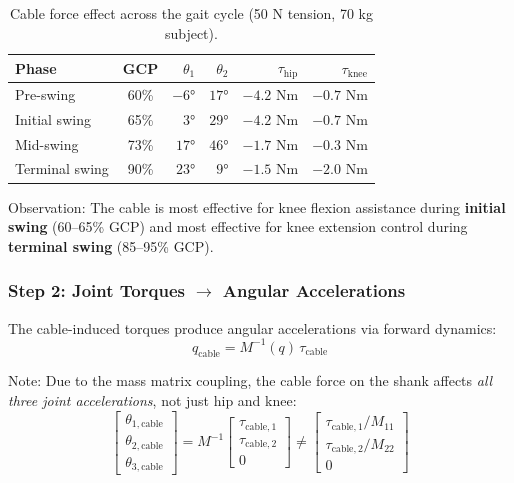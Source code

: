 \documentclass[11pt,a4paper]{article}
\newcommand{\vc}[1]{\bm{#1}}
\newcommand{\mat}[1]{\bm{#1}}
\newcommand{\ddt}[1]{\ddot{#1}}
\def\vc#1{#1}%
\def\mat#1{#1}%
\def\ddt#1{#1}%
\def\bm#1{#1}%
\begin{document}
\begin{table}[H]
\centering
\caption{Cable force effect across the gait cycle (50 N tension, 70 kg subject).}
\label{tab:cable_gait_phases}
\begin{tabular}{@{}lcrrrr@{}}
\toprule
\textbf{Phase} & \textbf{GCP} & $\theta_1$ & $\theta_2$ & $\tau_{\text{hip}}$ & $\tau_{\text{knee}}$ \\
\midrule
Pre-swing      & 60\%  & $-6°$  & $17°$ & $-4.2$ Nm & $-0.7$ Nm \\
Initial swing  & 65\%  & $3°$   & $29°$ & $-4.2$ Nm & $-0.7$ Nm \\
Mid-swing      & 73\%  & $17°$  & $46°$ & $-1.7$ Nm & $-0.3$ Nm \\
Terminal swing  & 90\%  & $23°$  & $9°$  & $-1.5$ Nm & $-2.0$ Nm \\
\bottomrule
\end{tabular}
\end{table}

Observation: The cable is most effective for knee flexion assistance
during \textbf{initial swing} (60--65\% GCP) and most effective for
knee extension control during \textbf{terminal swing} (85--95\% GCP).

\subsubsection*{Step 2: Joint Torques $\to$ Angular Accelerations}

The cable-induced torques produce angular accelerations via forward dynamics:
\begin{equation}
    \ddt{\vc{q}}_{\text{cable}} = \mat{M}^{-1}(\vc{q}) \, \vc{\tau}_{\text{cable}}
    \label{eq:cable_accel}
\end{equation}

Note: Due to the mass matrix coupling, the cable force on the shank
affects \textit{all three joint accelerations}, not just hip and knee:
\begin{equation}
    \begin{bmatrix} \ddt{\theta}_{1,\text{cable}} \\ \ddt{\theta}_{2,\text{cable}} \\ \ddt{\theta}_{3,\text{cable}} \end{bmatrix}
    = \mat{M}^{-1}
    \begin{bmatrix} \tau_{\text{cable},1} \\ \tau_{\text{cable},2} \\ 0 \end{bmatrix}
    \neq
    \begin{bmatrix} \tau_{\text{cable},1}/M_{11} \\ \tau_{\text{cable},2}/M_{22} \\ 0 \end{bmatrix}
\end{equation}
\end{document}
